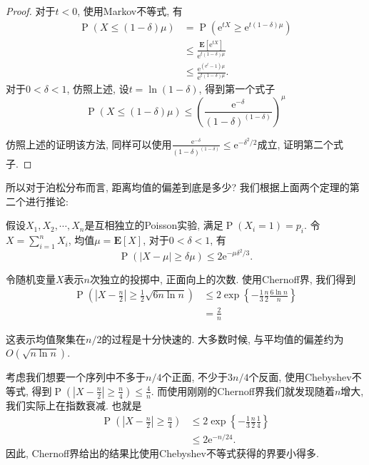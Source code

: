 \begin{proof}
    对于$t<0$, 使用Markov不等式, 有
    $$
\begin{aligned}
\operatorname{P}(X \leq(1-\delta) \mu) & =\operatorname{P}\left(\mathrm{e}^{t X} \geq \mathrm{e}^{t(1-\delta) \mu}\right) \\
& \leq \frac{\mathbf{E}\left[\mathrm{e}^{t X}\right]}{\mathrm{e}^{t(1-\delta) \mu}} \\
& \leq \frac{\mathrm{e}^{\left(\mathrm{e}^t-1\right) \mu}}{\mathrm{e}^{t(1-\delta) \mu}} .
\end{aligned}
$$
对于$0<\delta<1$, 仿照上述, 设$t=\ln(1-\delta)$, 得到第一个式子
$$
\operatorname{P}(X \leq(1-\delta) \mu) \leq\left(\frac{\mathrm{e}^{-\delta}}{(1-\delta)^{(1-\delta)}}\right)^\mu
$$

仿照上述的证明该方法, 同样可以使用$\frac{\mathrm{e}^{-\delta}}{(1-\delta)^{(1-\delta)}} \leq \mathrm{e}^{-\delta^2 / 2}$成立, 证明第二个式子. 

\end{proof}

所以对于泊松分布而言, 距离均值的偏差到底是多少? 我们根据上面两个定理的第二个进行推论: 
\begin{corollary}
    假设$X_1, X_2, \cdots, X_n$是互相独立的Poisson实验, 满足$\operatorname{P}\left(X_i=1\right)=p_i$. 令$X=\sum_{i=1}^n X_i$, 均值$\mu=\mathbf{E}[X]$, 对于$0<\delta<1$, 有
    $$\operatorname{P}(|X-\mu| \geq \delta \mu) \leq 2 \mathrm{e}^{-\mu \delta^2 / 3}.$$
\end{corollary}

\begin{example}[投硬币]
    令随机变量$X$表示$n$次独立的投掷中, 正面向上的次数. 使用Chernoff界, 我们得到
    $$\begin{aligned} \operatorname{P}\left(\left|X-\frac{n}{2}\right| \geq \frac{1}{2} \sqrt{6 n \ln n}\right) & \leq 2 \exp \left\{-\frac{1}{3} \frac{n}{2} \frac{6 \ln n}{n}\right\} \\ & =\frac{2}{n}\end{aligned}$$

    这表示均值聚集在$n/2$的过程是十分快速的. 大多数时候, 与平均值的偏差约为$O(\sqrt{n\ln n})$.

    考虑我们想要一个序列中不多于$n/4$个正面, 不少于$3n/4$个反面, 使用Chebyshev不等式, 得到$\operatorname{P}\left(\left|X-\frac{n}{2}\right| \geq \frac{n}{4}\right) \leq \frac{4}{n}$. 而使用刚刚的Chernoff界我们就发现随着$n$增大, 我们实际上在指数衰减. 也就是
    $$
\begin{aligned}
\operatorname{P}\left(\left|X-\frac{n}{2}\right| \geq \frac{n}{4}\right) & \leq 2 \exp \left\{-\frac{1}{3} \frac{n}{2} \frac{1}{4}\right\} \\
& \leq 2 \mathrm{e}^{-n / 24} .
\end{aligned}
$$
因此, Chernoff界给出的结果比使用Chebyshev不等式获得的界要小得多. 
    
\end{example}

